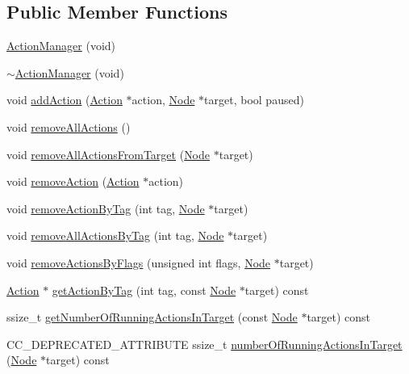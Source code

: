 \subsection*{Public Member Functions}
\begin{DoxyCompactItemize}
\item 
\hyperlink{classActionManager_a3c3e47b867da96699e32647b847b9df5}{Action\+Manager} (void)
\item 
\hyperlink{classActionManager_aa9a417d77050aa7f351df4996cf727e3}{$\sim$\+Action\+Manager} (void)
\item 
void \hyperlink{classActionManager_a88568fe751ad6e412b375e34b5584173}{add\+Action} (\hyperlink{classAction}{Action} $\ast$action, \hyperlink{classNode}{Node} $\ast$target, bool paused)
\item 
void \hyperlink{classActionManager_afe1a1a647e7c0432781c5146030fce5e}{remove\+All\+Actions} ()
\item 
void \hyperlink{classActionManager_a09444b573711b9389e460f9a71837299}{remove\+All\+Actions\+From\+Target} (\hyperlink{classNode}{Node} $\ast$target)
\item 
void \hyperlink{classActionManager_a06b04334e6282eba060000694088c807}{remove\+Action} (\hyperlink{classAction}{Action} $\ast$action)
\item 
void \hyperlink{classActionManager_aceaf0328518eb5f8d1cf6cea71594ee4}{remove\+Action\+By\+Tag} (int tag, \hyperlink{classNode}{Node} $\ast$target)
\item 
void \hyperlink{classActionManager_a2acfc347f4155ff6fc3e5261b09160a2}{remove\+All\+Actions\+By\+Tag} (int tag, \hyperlink{classNode}{Node} $\ast$target)
\item 
void \hyperlink{classActionManager_aceccce766c59e57c201474ea7f121a67}{remove\+Actions\+By\+Flags} (unsigned int flags, \hyperlink{classNode}{Node} $\ast$target)
\item 
\hyperlink{classAction}{Action} $\ast$ \hyperlink{classActionManager_abcc22187f785e996c04702afe161d383}{get\+Action\+By\+Tag} (int tag, const \hyperlink{classNode}{Node} $\ast$target) const
\item 
ssize\+\_\+t \hyperlink{classActionManager_add35fb2d5810bec63b59f432830746bc}{get\+Number\+Of\+Running\+Actions\+In\+Target} (const \hyperlink{classNode}{Node} $\ast$target) const
\item 
C\+C\+\_\+\+D\+E\+P\+R\+E\+C\+A\+T\+E\+D\+\_\+\+A\+T\+T\+R\+I\+B\+U\+TE ssize\+\_\+t \hyperlink{classActionManager_a9c8575014bda8867759c63aa17c519c3}{number\+Of\+Running\+Actions\+In\+Target} (\hyperlink{classNode}{Node} $\ast$target) const

\end{DoxyCompactItemize}
